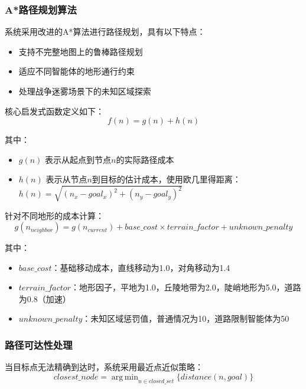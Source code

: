 \documentclass[12pt,a4paper]{article}
\DeclareMathOperator*{\argmin}{arg\,min}
\begin{document}
\subsubsection{A*路径规划算法}

系统采用改进的A*算法进行路径规划，具有以下特点：

\begin{itemize}
    \item 支持不完整地图上的鲁棒路径规划
    \item 适应不同智能体的地形通行约束 
    \item 处理战争迷雾场景下的未知区域探索
\end{itemize}

核心启发式函数定义如下：
\begin{equation}
f(n) = g(n) + h(n)
\end{equation}

其中：
\begin{itemize}
    \item $g(n)$ 表示从起点到节点$n$的实际路径成本
    \item $h(n)$ 表示从节点$n$到目标的估计成本，使用欧几里得距离：$h(n) = \sqrt{(n_x - goal_x)^2 + (n_y - goal_y)^2}$
\end{itemize}

针对不同地形的成本计算：
\begin{equation}
g(n_{neighbor}) = g(n_{current}) + base\_cost \times terrain\_factor + unknown\_penalty
\end{equation}

其中：
\begin{itemize}
    \item $base\_cost$：基础移动成本，直线移动为1.0，对角移动为1.4
    \item $terrain\_factor$：地形因子，平地为1.0，丘陵地带为2.0，陡峭地形为5.0，道路为0.8（加速）
    \item $unknown\_penalty$：未知区域惩罚值，普通情况为10，道路限制智能体为50
\end{itemize}

\subsubsection{路径可达性处理}

当目标点无法精确到达时，系统采用最近点近似策略：
\begin{equation}
closest\_node = \argmin_{n \in closed\_set} \{distance(n, goal)\}
\end{equation}
\end{document}
